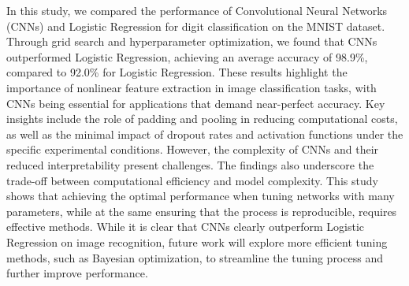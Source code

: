In this study, we compared the performance of Convolutional Neural Networks (CNNs) and Logistic Regression for digit classification on the MNIST dataset. Through grid search and hyperparameter optimization, we found that CNNs outperformed Logistic Regression, achieving an average accuracy of 98.9\%, compared to 92.0\% for Logistic Regression. These results highlight the importance of nonlinear feature extraction in image classification tasks, with CNNs being essential for applications that demand near-perfect accuracy. Key insights include the role of padding and pooling in reducing computational costs, as well as the minimal impact of dropout rates and activation functions under the specific experimental conditions. However, the complexity of CNNs and their reduced interpretability present challenges. The findings also underscore the trade-off between computational efficiency and model complexity. This study shows that achieving the optimal performance when tuning networks with many parameters, while at the same ensuring that the process is reproducible, requires effective methods. While it is clear that CNNs clearly outperform Logistic Regression on image recognition, future work will explore more efficient tuning methods, such as Bayesian optimization, to streamline the tuning process and further improve performance.
